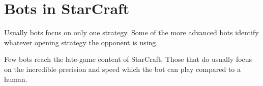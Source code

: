 \section{Bots in StarCraft}
Usually bots focus on only one strategy. Some of the more advanced bots identify whatever opening strategy the opponent is using.

Few bots reach the late-game content of StarCraft. Those that do usually focus on the incredible precision and speed which the bot can play compared to a human.

